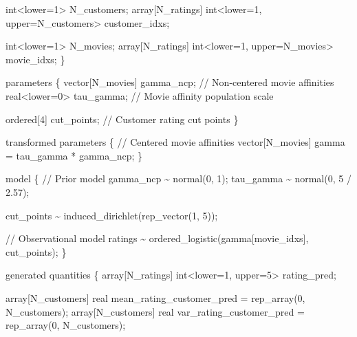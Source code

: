 \documentclass[
  letterpaper,
  DIV=11,
  numbers=noendperiod]{scrartcl}
\newenvironment{Shaded}{\begin{snugshade}}{\end{snugshade}}
\newcommand{\CommentTok}[1]{\textcolor[rgb]{0.37,0.37,0.37}{#1}}
\newcommand{\DataTypeTok}[1]{\textcolor[rgb]{0.68,0.00,0.00}{#1}}
\newcommand{\DecValTok}[1]{\textcolor[rgb]{0.68,0.00,0.00}{#1}}
\newcommand{\FloatTok}[1]{\textcolor[rgb]{0.68,0.00,0.00}{#1}}
\newcommand{\KeywordTok}[1]{\textcolor[rgb]{0.00,0.23,0.31}{#1}}
\newcommand{\NormalTok}[1]{\textcolor[rgb]{0.00,0.23,0.31}{#1}}
\begin{document}
\begin{codelisting}
\begin{Shaded}
\begin{Highlighting}[]
  \DataTypeTok{int}\NormalTok{\textless{}}\KeywordTok{lower}\NormalTok{=}\DecValTok{1}\NormalTok{\textgreater{} N\_customers;}
  \DataTypeTok{array}\NormalTok{[N\_ratings] }\DataTypeTok{int}\NormalTok{\textless{}}\KeywordTok{lower}\NormalTok{=}\DecValTok{1}\NormalTok{, }\KeywordTok{upper}\NormalTok{=N\_customers\textgreater{} customer\_idxs;}

  \DataTypeTok{int}\NormalTok{\textless{}}\KeywordTok{lower}\NormalTok{=}\DecValTok{1}\NormalTok{\textgreater{} N\_movies;}
  \DataTypeTok{array}\NormalTok{[N\_ratings] }\DataTypeTok{int}\NormalTok{\textless{}}\KeywordTok{lower}\NormalTok{=}\DecValTok{1}\NormalTok{, }\KeywordTok{upper}\NormalTok{=N\_movies\textgreater{} movie\_idxs;}
\NormalTok{\}}

\KeywordTok{parameters}\NormalTok{ \{}
  \DataTypeTok{vector}\NormalTok{[N\_movies] gamma\_ncp; }\CommentTok{// Non{-}centered movie affinities}
  \DataTypeTok{real}\NormalTok{\textless{}}\KeywordTok{lower}\NormalTok{=}\DecValTok{0}\NormalTok{\textgreater{} tau\_gamma;    }\CommentTok{// Movie affinity population scale}

  \DataTypeTok{ordered}\NormalTok{[}\DecValTok{4}\NormalTok{] cut\_points;      }\CommentTok{// Customer rating cut points}
\NormalTok{\}}

\KeywordTok{transformed parameters}\NormalTok{ \{}
  \CommentTok{// Centered movie affinities}
  \DataTypeTok{vector}\NormalTok{[N\_movies] gamma = tau\_gamma * gamma\_ncp;}
\NormalTok{\}}

\KeywordTok{model}\NormalTok{ \{}
  \CommentTok{// Prior model}
\NormalTok{  gamma\_ncp \textasciitilde{} normal(}\DecValTok{0}\NormalTok{, }\DecValTok{1}\NormalTok{);}
\NormalTok{  tau\_gamma \textasciitilde{} normal(}\DecValTok{0}\NormalTok{, }\DecValTok{5}\NormalTok{ / }\FloatTok{2.57}\NormalTok{);}

\NormalTok{  cut\_points \textasciitilde{} induced\_dirichlet(rep\_vector(}\DecValTok{1}\NormalTok{, }\DecValTok{5}\NormalTok{));}

  \CommentTok{// Observational model}
\NormalTok{  ratings \textasciitilde{} ordered\_logistic(gamma[movie\_idxs], cut\_points);}
\NormalTok{\}}

\KeywordTok{generated quantities}\NormalTok{ \{}
  \DataTypeTok{array}\NormalTok{[N\_ratings] }\DataTypeTok{int}\NormalTok{\textless{}}\KeywordTok{lower}\NormalTok{=}\DecValTok{1}\NormalTok{, }\KeywordTok{upper}\NormalTok{=}\DecValTok{5}\NormalTok{\textgreater{} rating\_pred;}

  \DataTypeTok{array}\NormalTok{[N\_customers] }\DataTypeTok{real}\NormalTok{ mean\_rating\_customer\_pred}
\NormalTok{    = rep\_array(}\DecValTok{0}\NormalTok{, N\_customers);}
  \DataTypeTok{array}\NormalTok{[N\_customers] }\DataTypeTok{real}\NormalTok{ var\_rating\_customer\_pred}
\NormalTok{    = rep\_array(}\DecValTok{0}\NormalTok{, N\_customers);}


\end{Highlighting}
\end{Shaded}
\end{codelisting}
\end{document}
